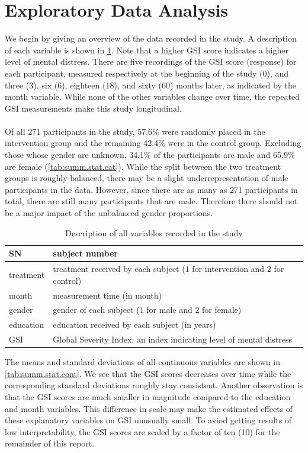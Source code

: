 \section{Exploratory Data Analysis}\label{sec:eda}
We begin by giving an overview of the data recorded in the study. A description of each variable is shown in \cref{tab:var.decription}. Note that a higher GSI score indicates a higher level of mental distress. There are five recordings of the GSI score (response) for each participant, measured respectively at the beginning of the study (0), and three (3), six (6), eighteen (18), and sixty (60) months later, as indicated by the month variable. While none of the other variables change over time, the repeated GSI measurements make this study longitudinal.\\\\
Of all 271 participants in the study, 57.6\% were randomly placed in the intervention group and the remaining 42.4\% were in the control group. Excluding those whose gender are unknown, 34.1\% of the participants are male and 65.9\% are female (\cref{tab:summ.stat.cat}). While the split between the two treatment groups is roughly balanced, there may be a slight underrepresentation of male participants in the data. However, since there are as many as 271 participants in total, there are still many participants that are male. Therefore there should not be a major impact of the unbalanced gender proportions.
\begin{table}[H]
\centering
\begin{tabular}{|l|l|}
\hline
SN & subject number \\
\hline
treatment & treatment received by each subject ($1$ for intervention and $2$ for control)\\
\hline
month & measurement time (in month)\\
\hline
gender & gender of each subject ($1$ for male and $2$ for female)\\
\hline
education & education received by each subject (in years)\\
\hline
GSI & Global Severity Index: an index indicating level of mental distress\\
\hline
\end{tabular}
\caption{Description of all variables recorded in the study}
\label{tab:var.decription}
\end{table}
\noindent The means and standard deviations of all continuous variables are shown in \cref{tab:summ.stat.cont}. We see that the GSI scores decreases over time while the corresponding standard deviations roughly stay consistent. Another observation is that the GSI scores are much smaller in magnitude compared to the education and month variables. This difference in scale may make the estimated effects of these explanatory variables on GSI unusually small. To aviod getting results of low interpretability, the GSI scores are scaled by a factor of ten (10) for the remainder of this report.\\\\
